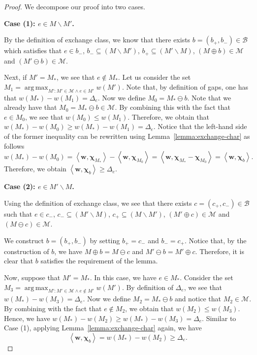 \documentclass{article}
\newcommand{\M}{\mathcal M}
\newcommand{\B}{\mathcal B}
\newcommand{\del}{\backslash}
\DeclareMathOperator*{\argmax}{arg\,max}
\newcommand{\inn}[1]{\left\langle #1 \right\rangle}
\renewcommand{\vec}[1]{\boldsymbol{#1}}
\begin{document}
\begin{proof}
We decompose our proof into two cases.

\textbf{Case (1): $e\in M\del M'$.}

By the definition of exchange class, we know that 
there exists $b=(b_+, b_-) \in \B$ which satisfies that
$e\in b_-$, $b_- \subseteq (M\del M') $, $b_+\subseteq (M' \del M)$, $(M\oplus b) \in \M$ and $(M'\ominus b) \in \M$.

Next, if $M'=M_*$, we see that $e\not \in M_*$.
Let us consider the set $M_1 = \argmax_{M': M'\in \M \wedge e\in M'} w(M')$.
Note that, by definition of gaps, one has that $w(M_*)-w(M_1) = \Delta_e$.
Now we define $M_0 = M_*\ominus b$. 
Note that we already have that $M_0=M_* \ominus b \in \M$.  
By combining this with the fact that $e\in M_0$, we see that $w(M_0) \le w(M_1)$. 
Therefore, we obtain that
$w(M_*)-w(M_0) \ge w(M_*)-w(M_1) = \Delta_e$.
Notice that the left-hand side of the former inequality can be rewritten using Lemma~\ref{lemma:exchange-char} as follows
$$
w(M_*)-w(M_0) = \inn{\vec w, \vec \chi_{M_*}}-\inn{\vec w, \vec \chi_{M_0}} = \inn{\vec w, \vec \chi_{M_*}-\vec\chi_{M_0}}
= \inn{\vec w,\vec \chi_b}.
$$
Therefore, we obtain $\inn{\vec w,\vec \chi_b} \ge \Delta_e$.

\textbf{Case (2): $e\in M'\del M$.}

Using the definition of exchange class, we see that 
there exists $c=(c_+,c_-)\in \B$ such that 
$e\in c_-$, $c_-\subseteq (M'\del M)$, $c_+\subseteq (M\del M')$, $(M'\oplus c)\in \M$
and $(M\ominus c)\in \M$.

We construct $b=(b_+,b_-)$ by setting $b_+=c_-$ and $b_-=c_+$. 
Notice that, by the construction of $b$, we have $M\oplus b = M\ominus c$ and $M'\ominus b = M'\oplus c$.
Therefore, it is clear that $b$ satisfies the requirement of the lemma.


Now, suppose that $M'=M_*$. 
In this case, we have $e\in M_*$.
Consider the set $M_3 = \argmax_{M': M'\in \M \wedge e\not \in M'} w(M')$.
By definition of $\Delta_e$, we see that $w(M_*)-w(M_3)=\Delta_e$.
Now we define $M_2 = M_* \ominus b$ and notice that  $M_2 \in \M$.
By combining with the fact that $e\not \in M_2$, we obtain that $w(M_2) \le w(M_3)$.
Hence, we have
$w(M_*)-w(M_2) \ge w(M_*)-w(M_3)=\Delta_e$.
Similar to Case (1), applying Lemma~\ref{lemma:exchange-char} again, we have
$$
\inn{\vec w,\vec \chi_b} = w(M_*)-w(M_2) \ge \Delta_e.
$$
\end{proof}
\end{document}
